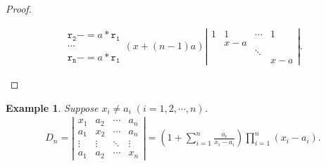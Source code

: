 \documentclass{report}
\newtheorem{example}{Example}[section]
\theoremstyle{nonumberplain}
\newtheorem{proof}{Proof.}
\newcommand{\minuseq}{\mathrel{{-}{=}}}
\begin{document}
\begin{proof}
\begin{enumerate}
\begin{equation*}
\begin{aligned}
{{						      \begin{array}{l}
							      \mathtt{r_2\minuseq \mathit{a}* r_1} \\
							      \cdots                               \\
							      \mathtt{r_n\minuseq \mathit{a}* r_1}
						      \end{array}}}
				      \left(x+(n-1)a\right)\left|
				      \begin{array}{cccc}
					      1 & 1   & \cdots & 1   \\
					        & x-a &        &     \\
					        &     & \ddots &     \\
					        &     &        & x-a
				      \end{array}\right|.
			      \end{aligned}
		      \end{equation*}
	\end{enumerate}
\end{proof}
\begin{example} Suppose $x_i\ne a_i\;(i=1,2,\cdots,n)$.
	\begin{equation*}
		\begin{aligned}
			D_{n}=\left|\begin{array}{cccc}
				x_{1}  & a_{2}  & \cdots & a_{n}  \\
				a_{1}  & x_{2}  & \cdots & a_{n}  \\
				\vdots & \vdots & \ddots & \vdots \\
				a_{1}  & a_{2}  & \cdots & x_{n}
			\end{array}\right|=\left(1+\sum_{i=1}^{n} \frac{a_{i}}{x_{i}-a_{i}}\right) \prod_{i=1}^{n}\left(x_{i}-a_{i}\right).
		\end{aligned}
	\end{equation*}
\end{example}
\end{document}
